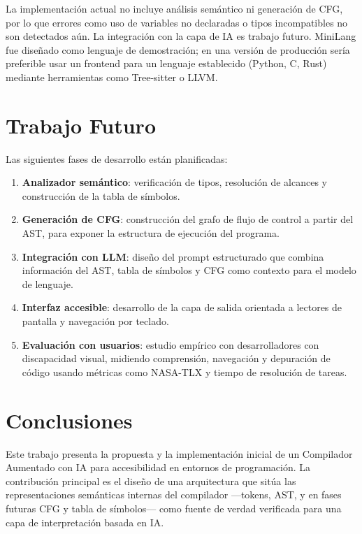 \documentclass[conference]{IEEEtran}
\begin{document}
La implementación actual no incluye análisis semántico ni generación de CFG, por lo que errores como uso de variables no declaradas o tipos incompatibles no son detectados aún. La integración con la capa de IA es trabajo futuro. MiniLang fue diseñado como lenguaje de demostración; en una versión de producción sería preferible usar un frontend para un lenguaje establecido (Python, C, Rust) mediante herramientas como Tree-sitter o LLVM.

\section{Trabajo Futuro}

Las siguientes fases de desarrollo están planificadas:

\begin{enumerate}
    \item \textbf{Analizador semántico}: verificación de tipos, resolución de alcances y construcción de la tabla de símbolos.
    \item \textbf{Generación de CFG}: construcción del grafo de flujo de control a partir del AST, para exponer la estructura de ejecución del programa.
    \item \textbf{Integración con LLM}: diseño del prompt estructurado que combina información del AST, tabla de símbolos y CFG como contexto para el modelo de lenguaje.
    \item \textbf{Interfaz accesible}: desarrollo de la capa de salida orientada a lectores de pantalla y navegación por teclado.
    \item \textbf{Evaluación con usuarios}: estudio empírico con desarrolladores con discapacidad visual, midiendo comprensión, navegación y depuración de código usando métricas como NASA-TLX y tiempo de resolución de tareas.
\end{enumerate}

\section{Conclusiones}

Este trabajo presenta la propuesta y la implementación inicial de un Compilador Aumentado con IA para accesibilidad en entornos de programación. La contribución principal es el diseño de una arquitectura que sitúa las representaciones semánticas internas del compilador —tokens, AST, y en fases futuras CFG y tabla de símbolos— como fuente de verdad verificada para una capa de interpretación basada en IA.
\end{document}
